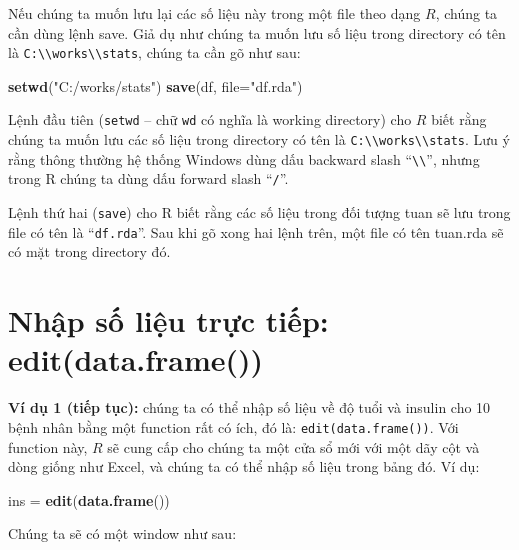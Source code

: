 \documentclass[
]{book}
\newenvironment{Shaded}{\begin{snugshade}}{\end{snugshade}}
\newcommand{\DataTypeTok}[1]{\textcolor[rgb]{0.13,0.29,0.53}{#1}}
\newcommand{\KeywordTok}[1]{\textcolor[rgb]{0.13,0.29,0.53}{\textbf{#1}}}
\newcommand{\NormalTok}[1]{#1}
\newcommand{\StringTok}[1]{\textcolor[rgb]{0.31,0.60,0.02}{#1}}
\begin{document}
Nếu chúng ta muốn lưu lại các số liệu này trong một file theo dạng \(R\), chúng ta cần dùng lệnh save. Giả dụ như chúng ta muốn lưu số liệu trong directory có tên là \texttt{C:\textbackslash{}\textbackslash{}works\textbackslash{}\textbackslash{}stats}, chúng ta cần gõ như sau:

\begin{Shaded}
\begin{Highlighting}[]
\KeywordTok{setwd}\NormalTok{(}\StringTok{"C:/works/stats"}\NormalTok{)}
\KeywordTok{save}\NormalTok{(df, }\DataTypeTok{file=}\StringTok{"df.rda"}\NormalTok{)}
\end{Highlighting}
\end{Shaded}

Lệnh đầu tiên (\texttt{setwd} -- chữ \texttt{wd} có nghĩa là working directory) cho \(R\) biết rằng chúng ta muốn lưu các số liệu trong directory có tên là \texttt{C:\textbackslash{}\textbackslash{}works\textbackslash{}\textbackslash{}stats}. Lưu ý rằng thông thường hệ thống Windows dùng dấu backward slash ``\texttt{\textbackslash{}\textbackslash{}}'', nhưng trong R chúng ta dùng dấu forward slash ``\texttt{/}''.

Lệnh thứ hai (\texttt{save}) cho R biết rằng các số liệu trong đối tượng tuan sẽ lưu trong file có tên là ``\texttt{df.rda}''. Sau khi gõ xong hai lệnh trên, một file có tên tuan.rda sẽ có mặt trong directory đó.

\hypertarget{nhux1eadp-sux1ed1-liux1ec7u-trux1ef1c-tiux1ebfp-editdata.frame}{%
\section{Nhập số liệu trực tiếp: edit(data.frame())}\label{nhux1eadp-sux1ed1-liux1ec7u-trux1ef1c-tiux1ebfp-editdata.frame}}

\textbf{Ví dụ 1 (tiếp tục):} chúng ta có thể nhập số liệu về độ tuổi và insulin cho 10 bệnh nhân bằng một function rất có ích, đó là: \texttt{edit(data.frame())}. Với function này, \(R\) sẽ cung cấp cho chúng ta một cửa sổ mới với một dãy cột và dòng giống như Excel, và chúng ta có thể nhập số liệu trong bảng đó. Ví dụ:

\begin{Shaded}
\begin{Highlighting}[]
\NormalTok{ins =}\StringTok{ }\KeywordTok{edit}\NormalTok{(}\KeywordTok{data.frame}\NormalTok{())}
\end{Highlighting}
\end{Shaded}

Chúng ta sẽ có một window như sau:
\end{document}
